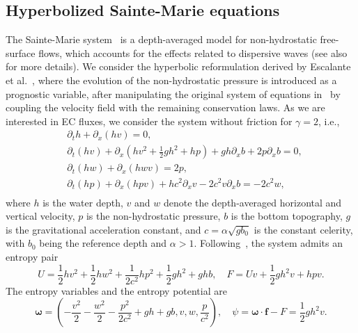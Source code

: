 \documentclass[]{scrartcl}
\renewcommand{\vec}[1]{\boldsymbol{#1}}
\theoremstyle{definition}
\begin{document}
\subsection{Hyperbolized Sainte-Marie equations}
The Sainte-Marie system~\cite{saintemarie2015,sainte2011vertically} is a depth-averaged model for non-hydrostatic free-surface flows, which accounts for the effects related to dispersive waves (see also~\cite{fernandeznieto:hal-01324012} for more details).
We consider the hyperbolic reformulation derived by Escalante et al.~\cite{ESCALANTE2019385}, where the evolution of the non-hydrostatic pressure is introduced as a prognostic variable, after manipulating the original system of equations in~\cite{saintemarie2015} by coupling the velocity field with the remaining conservation laws.
As we are interested in EC fluxes, we consider the system without friction for $\gamma = 2$, i.e.,
\begin{equation}
    \label{eq:escalante_saintemarie}
    \begin{aligned}
    &\partial_t h + \partial_x (h v) = 0, \\
    &\partial_t (h v) + \partial_x \left(h v^2 + \frac{1}{2} g h^2 + hp\right) + gh \partial_x b + 2p \partial_x b = 0,\\
    &\partial_t (h w) + \partial_x (h w v) = 2p,\\
    &\partial_t (hp) + \partial_x (h p v) + h c^2 \partial_x v - 2 c^2 v \partial_x b = -2 c^2 w,\\
     \end{aligned}
\end{equation}
where $h$ is the water depth, $v$ and $w$ denote the depth-averaged horizontal and vertical velocity, $p$ is the non-hydrostatic pressure, $b$ is the bottom topography, $g$ is the gravitational acceleration constant, and $c = \alpha \sqrt{g b_0}$ is the constant celerity, with $b_0$ being the reference depth and $\alpha >1$. Following~\cite{ESCALANTE2019385}, the system admits an entropy pair
\begin{equation}
U = \frac{1}{2}h v^2 + \frac{1}{2}h w^2 + \frac{1}{2c^2} h p^2 + \frac{1}{2}gh^2 + ghb, \quad F = U v + \frac{1}{2}g h^2 v + h p v.
\end{equation}
The entropy variables and the entropy potential are
\begin{equation}
\vec{\omega} = \left ( -\frac{v^2}{2} - \frac{w^2}{2} - \frac{p^2}{2c^2} + gh + gb, v, w, \frac{p}{c^2} \right ), \quad \psi = \vec{\omega} \cdot \vec{f} - F = \frac{1}{2} g h^2 v.
\end{equation}
\end{document}

